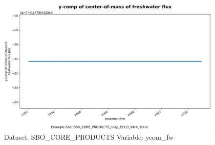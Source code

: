 \begin{figure}[H]
\centering
\includegraphics[width=\textwidth]{../images/plots/oneD_plots/SBO_Core_Products/ycom_fw.png}
\caption{Dataset: SBO\_CORE\_PRODUCTS Variable: ycom\_fw}
\label{tab:table-SBO_CORE_PRODUCTS_ycom_fw-Plot}
\end{figure}
\pagebreak
